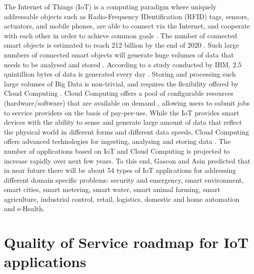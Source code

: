 
\setcounter{section}{0}
\setcounter{figure}{0}
\graphicspath{{./figs/}{./figs/item-rajiv/}}


The Internet of Things (IoT) is a computing paradigm where uniquely addressable objects such as Radio-Frequency IDentification (RFID) tags, sensors, actuators, and mobile phones, are able to connect via the Internet, and cooperate with each other in order to achieve common goals \cite{ref1,ref4}.
The number of connected smart objects is estimated to reach 212 billion by the end of 2020 \cite{ref2,ref3}.
Such large numbers of connected smart objects will generate huge volumes of data that needs to be analysed and stored \cite{ref6}.
According to a study conducted by IBM, 2.5 quintillion bytes of data is generated every day \cite{ref7}.
Storing and processing such large volumes of Big Data is non-trivial, and requires the flexibility offered by Cloud Computing \cite{ref8}.
Cloud Computing offers a pool of configurable resources (hardware/software) that are available on demand \cite{ref9},
allowing users to submit jobs to service providers on the basis of pay-per-use.
While the IoT provides smart devices with the ability to sense and generate large amount of data that reflect the physical world in different forms and different data speeds,
Cloud Computing offers advanced technologies for ingesting, analysing and storing data \cite{ref10}.
The number of applications based on IoT and Cloud Computing is projected to increase rapidly over next few years.
To this end, Gascon and Asin \cite{ref11} predicted that in near future there will be about 54 types of IoT applications for addressing different domain \cite{ref5} specific problems: security and emergency, smart environment, smart cities, smart metering, smart water, smart animal farming, smart agriculture, industrial control, retail, logistics, domestic and home automation and e-Health. 

\section{Quality of Service roadmap for IoT applications}

